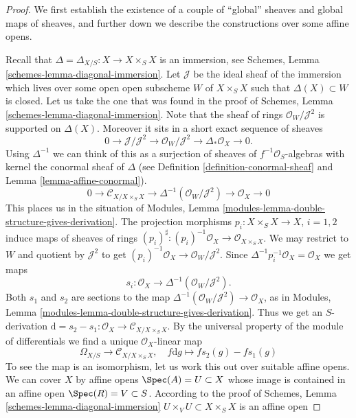 \begin{proof}
We first establish the existence of a couple of ``global'' sheaves
and global maps of sheaves, and further down we describe
the constructions over some affine opens.

\medskip\noindent
Recall that $\Delta = \Delta_{X/S} : X \to X \times_S X$
is an immersion, see Schemes, Lemma \ref{schemes-lemma-diagonal-immersion}.
Let $\mathcal{J}$ be the ideal sheaf of the immersion
which lives over some open open subscheme $W$ of $X \times_S X$
such that $\Delta(X) \subset W$ is closed. Let us take the one that
was found in the proof of
Schemes, Lemma \ref{schemes-lemma-diagonal-immersion}.
Note that the sheaf of rings $\mathcal{O}_W/\mathcal{J}^2$
is supported on $\Delta(X)$. Moreover it sits in a
short exact sequence of sheaves
$$
0 \to \mathcal{J}/\mathcal{J}^2
\to \mathcal{O}_W/\mathcal{J}^2
\to \Delta_*\mathcal{O}_X
\to 0.
$$
Using $\Delta^{-1}$ we can think of this as a surjection of
sheaves of $f^{-1}\mathcal{O}_S$-algebras with kernel the
conormal sheaf of $\Delta$ (see Definition \ref{definition-conormal-sheaf}
and Lemma \ref{lemma-affine-conormal}).
$$
0 \to \mathcal{C}_{X/X \times_S X}
\to \Delta^{-1}(\mathcal{O}_W/\mathcal{J}^2)
\to \mathcal{O}_X
\to 0
$$
This places us in the situation of
Modules, Lemma \ref{modules-lemma-double-structure-gives-derivation}.
The projection morphisms $p_i : X \times_S X \to X$, $i = 1, 2$ induce
maps of sheaves of rings
$(p_i)^\sharp : (p_i)^{-1}\mathcal{O}_X \to \mathcal{O}_{X \times_S X}$.
We may restrict to $W$ and quotient by $\mathcal{J}^2$ to get
$(p_i)^{-1}\mathcal{O}_X \to \mathcal{O}_W/\mathcal{J}^2$.
Since $\Delta^{-1}p_i^{-1}\mathcal{O}_X = \mathcal{O}_X$
we get maps
$$
s_i : \mathcal{O}_X \to \Delta^{-1}(\mathcal{O}_W/\mathcal{J}^2).
$$
Both $s_1$ and $s_2$ are sections to the map
$\Delta^{-1}(\mathcal{O}_W/\mathcal{J}^2) \to \mathcal{O}_X$,
as in Modules, Lemma \ref{modules-lemma-double-structure-gives-derivation}.
Thus we get an $S$-derivation
$\text{d} = s_2 - s_1 : \mathcal{O}_X \to \mathcal{C}_{X/X \times_S X}$.
By the universal property of the module of differentials we find a
unique $\mathcal{O}_X$-linear map
$$
\Omega_{X/S} \longrightarrow \mathcal{C}_{X/X \times_S X},\quad
f\text{d}g \longmapsto fs_2(g) - fs_1(g)
$$
To see the map is an isomorphism, let us work this out over suitable affine
opens. We can cover $X$ by affine opens $\Spec(A) = U \subset X$
whose image is contained in an affine open $\Spec(R) = V \subset S$.
According to the proof of Schemes, Lemma \ref{schemes-lemma-diagonal-immersion}
$U \times_V U \subset X \times_S X$ is an affine open

\end{proof}
